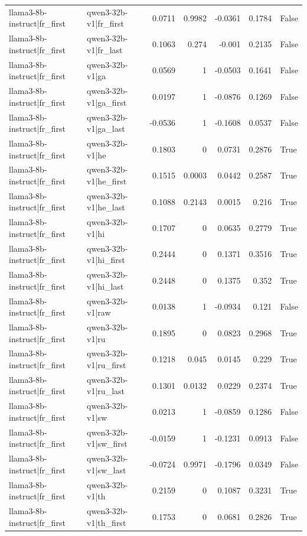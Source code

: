 \begin{table}
\begin{tabular}{l l r r r r l}
llama3-8b-instruct|fr_first & qwen3-32b-v1|fr_first & 0.0711 & 0.9982 & -0.0361 & 0.1784 & False \\
llama3-8b-instruct|fr_first & qwen3-32b-v1|fr_last & 0.1063 & 0.274 & -0.001 & 0.2135 & False \\
llama3-8b-instruct|fr_first & qwen3-32b-v1|ga & 0.0569 & 1 & -0.0503 & 0.1641 & False \\
llama3-8b-instruct|fr_first & qwen3-32b-v1|ga_first & 0.0197 & 1 & -0.0876 & 0.1269 & False \\
llama3-8b-instruct|fr_first & qwen3-32b-v1|ga_last & -0.0536 & 1 & -0.1608 & 0.0537 & False \\
llama3-8b-instruct|fr_first & qwen3-32b-v1|he & 0.1803 & 0 & 0.0731 & 0.2876 & True \\
llama3-8b-instruct|fr_first & qwen3-32b-v1|he_first & 0.1515 & 0.0003 & 0.0442 & 0.2587 & True \\
llama3-8b-instruct|fr_first & qwen3-32b-v1|he_last & 0.1088 & 0.2143 & 0.0015 & 0.216 & True \\
llama3-8b-instruct|fr_first & qwen3-32b-v1|hi & 0.1707 & 0 & 0.0635 & 0.2779 & True \\
llama3-8b-instruct|fr_first & qwen3-32b-v1|hi_first & 0.2444 & 0 & 0.1371 & 0.3516 & True \\
llama3-8b-instruct|fr_first & qwen3-32b-v1|hi_last & 0.2448 & 0 & 0.1375 & 0.352 & True \\
llama3-8b-instruct|fr_first & qwen3-32b-v1|raw & 0.0138 & 1 & -0.0934 & 0.121 & False \\
llama3-8b-instruct|fr_first & qwen3-32b-v1|ru & 0.1895 & 0 & 0.0823 & 0.2968 & True \\
llama3-8b-instruct|fr_first & qwen3-32b-v1|ru_first & 0.1218 & 0.045 & 0.0145 & 0.229 & True \\
llama3-8b-instruct|fr_first & qwen3-32b-v1|ru_last & 0.1301 & 0.0132 & 0.0229 & 0.2374 & True \\
llama3-8b-instruct|fr_first & qwen3-32b-v1|sw & 0.0213 & 1 & -0.0859 & 0.1286 & False \\
llama3-8b-instruct|fr_first & qwen3-32b-v1|sw_first & -0.0159 & 1 & -0.1231 & 0.0913 & False \\
llama3-8b-instruct|fr_first & qwen3-32b-v1|sw_last & -0.0724 & 0.9971 & -0.1796 & 0.0349 & False \\
llama3-8b-instruct|fr_first & qwen3-32b-v1|th & 0.2159 & 0 & 0.1087 & 0.3231 & True \\
llama3-8b-instruct|fr_first & qwen3-32b-v1|th_first & 0.1753 & 0 & 0.0681 & 0.2826 & True \\

\end{tabular}
\end{table}
